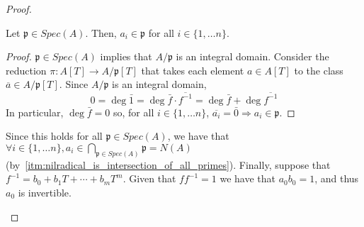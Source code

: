 \begin{problem}
\begin{enumerate}[label=(\theproblem.\arabic*),ref=\theproblem.\arabic*]
\begin{sol}
\begin{proof}
\begin{itemize}
\begin{claim}
                            Let $\mathfrak{p} \in Spec(A)$.
                            Then, $a_i \in \mathfrak{p}$ for all $i \in \{1, \ldots n\}$.
                            \begin{proof}
                                $\mathfrak{p} \in Spec(A)$ implies that $A/\mathfrak{p}$ is an integral domain.
                                Consider the reduction $\pi: A[T] \rightarrow A/\mathfrak{p}[T]$ that takes each element $a \in A[T]$ to the class $\overline{a} \in A/\mathfrak{p}[T]$.
                                Since $A/\mathfrak{p}$ is an integral domain,
                                \[
                                    0 = \deg \bar{1} = \deg \bar{f} \cdot \overline{f^{-1}} =
                                    \deg \bar{f} + \deg \overline{f^{-1}}
                                \]
                                In particular, $\deg \bar{f} = 0$ so, for all $i \in \{1, \ldots n\}$,
                                $\overline{a_i} = \bar{0} \Rightarrow a_i \in \mathfrak{p}$.
                            \end{proof}
                        \end{claim}
                        Since this holds for all $\mathfrak{p} \in Spec(A)$, we have that $ \forall i \in \{1, \ldots n\},
                        a_i \in \bigcap_{\mathfrak{p} \in Spec(A)}\mathfrak{p} = N(A)$ (by~\ref{itm:nilradical_is_intersection_of_all_primes}).
                        Finally, suppose that $f^{-1} = b_0 + b_1 T + \cdots + b_m T^m$.
                        Given that $f f^{-1}=1$ we have that $a_0 b_0 = 1$, and thus $a_0$ is invertible.
                    \end{itemize}
                \end{proof}
            \end{sol}


\end{enumerate}
\end{problem}
